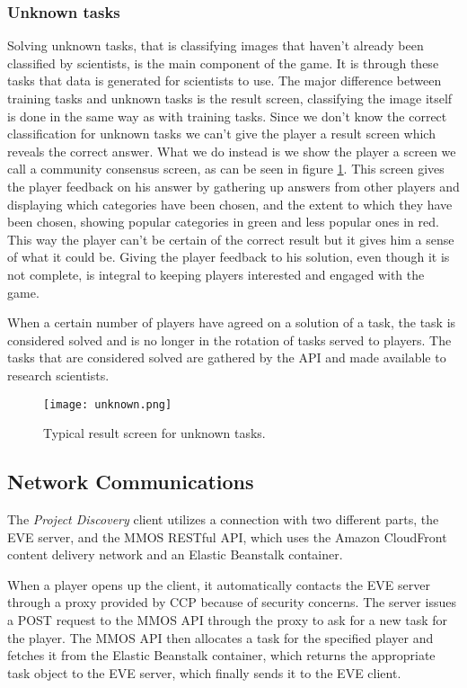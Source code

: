 \subsubsection{Unknown tasks}
Solving unknown tasks, that is classifying images that haven't already been classified by scientists, is the main component of the game. It is through these tasks that data is generated for scientists to use. The major difference between training tasks and unknown tasks is the result screen, classifying the image itself is done in the same way as with training tasks. Since we don't know the correct classification for unknown tasks we can't give the player a result screen which reveals the correct answer. What we do instead is we show the player a screen we call a community consensus screen, as can be seen in figure \ref{fig:unknown}. This screen gives the player feedback on his answer by gathering up answers from other players and displaying which categories have been chosen, and the extent to which they have been chosen, showing popular categories in green and less popular ones in red. This way the player can't be certain of the correct result but it gives him a sense of what it could be. Giving the player feedback to his solution, even though it is not complete, is integral to keeping players interested and engaged with the game.

When a certain number of players have agreed on a solution of a task, the task is considered solved and is no longer in the rotation of tasks served to players. The tasks that are considered solved are gathered by the API and made available to research scientists.

\begin{figure}[H]
\centering
\graphicspath{ {./graphics/} }
\centerline{\texttt{[image: unknown.png]}}
\caption{\label{fig:unknown} Typical result screen for unknown tasks.}
\end{figure}

\subsection{Network Communications}
The \emph{Project Discovery} client utilizes a connection with two different parts, the EVE server, and the MMOS RESTful API, which uses the Amazon CloudFront content delivery network and an Elastic Beanstalk container.

When a player opens up the client, it automatically contacts the EVE server through a proxy provided by CCP because of security concerns. The server issues a POST request to the MMOS API through the proxy to ask for a new task for the player. The MMOS API then allocates a task for the specified player and fetches it from the Elastic Beanstalk container, which returns the appropriate task object to the EVE server, which finally sends it to the EVE client. 

